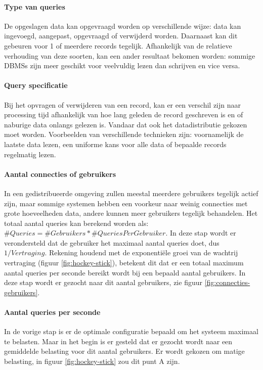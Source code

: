 \paragraph{Type van queries} De opgeslagen data kan opgevraagd worden op verschillende wijze: data kan ingevoegd, aangepast, opgevraagd of verwijderd worden. Daarnaast kan dit gebeuren voor 1 of meerdere records tegelijk. Afhankelijk van de relatieve verhouding van deze soorten, kan een ander resultaat bekomen worden: sommige \glspl{DBMS} zijn meer geschikt voor veelvuldig lezen dan schrijven en vice versa. 

\paragraph{Query specificatie} Bij het opvragen of verwijderen van een record, kan er een verschil zijn naar processing tijd afhankelijk van hoe lang geleden de record geschreven is en of naburige data onlangs gelezen is. Vandaar dat ook het datadistributie gekozen moet worden. Voorbeelden van verschillende technieken zijn: voornamelijk de laatste data lezen, een uniforme kans voor alle data of bepaalde records regelmatig lezen.

\paragraph{Aantal connecties of gebruikers} In een gedistribueerde omgeving zullen meestal meerdere gebruikers tegelijk actief zijn, maar sommige systemen hebben een voorkeur naar weinig connecties met grote hoeveelheden data, andere kunnen meer gebruikers tegelijk behandelen. Het totaal aantal queries kan berekend worden als: $\#Queries = \#Gebruikers * \#QueriesPerGebruiker$. In deze stap wordt er verondersteld dat de gebruiker het maximaal aantal queries doet, dus $1/Vertraging$. Rekening houdend met de exponentiële groei van de wachtrij vertraging (figuur \ref{fig:hockey-stick}), betekent dit dat er een totaal maximum aantal queries per seconde bereikt wordt bij een bepaald aantal gebruikers. In deze stap wordt er gezocht naar dit aantal gebruikers, zie figuur \ref{fig:connecties-gebruikers}. 

\paragraph{Aantal queries per seconde} In de vorige stap is er de optimale configuratie bepaald om het systeem maximaal te belasten. Maar in het begin is er gesteld dat er gezocht wordt naar een gemiddelde belasting voor dit aantal gebruikers. Er wordt gekozen om matige belasting, in figuur \ref{fig:hockey-stick} zou dit punt A zijn. 


